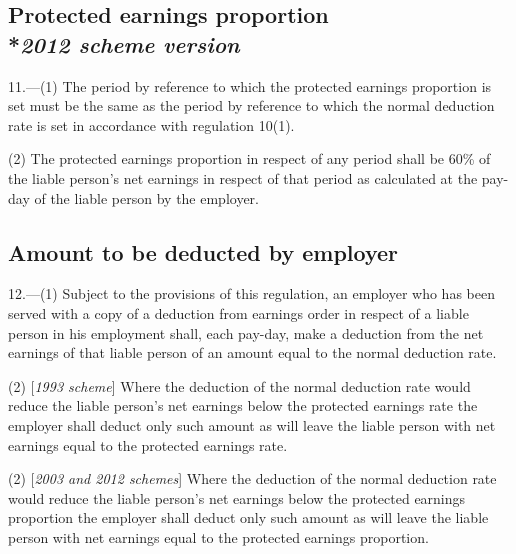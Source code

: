 \documentclass[12pt,a4paper]{article}
\begin{document}
\subsection[11. Protected earnings proportion --- \emph{2012 scheme version}]{Protected earnings proportion\\*\emph{2012 scheme version}}

11.---(1)  The period by reference to which the protected earnings proportion is set must be the same as the period by reference to which the normal deduction rate is set in accordance with regulation 10(1).

(2) The protected earnings proportion in respect of any period shall be 60\% of the liable person’s net earnings in respect of that period as calculated at the pay-day of the liable person by the employer.


\subsection[12. Amount to be deducted by employer]{Amount to be deducted by employer}

12.—(1) Subject to the provisions of this regulation, an employer who has been served with a copy of a deduction from earnings order in respect of a liable person in his employment shall, each pay-day, make a deduction from the net earnings of that liable person of an amount equal to the normal deduction rate.

(2) [\emph{1993 scheme}] Where the deduction of the normal deduction rate would reduce the liable person’s net earnings below the protected earnings rate the employer shall deduct only such amount as will leave the liable person with net earnings equal to the protected earnings rate.

(2) [\emph{2003 and 2012 schemes}] Where the deduction of the normal deduction rate would reduce the liable person’s net earnings below the 
protected earnings proportion  %
the employer shall deduct only such amount as will leave the liable person with net earnings equal to the 
protected earnings proportion.  %
\end{document}
